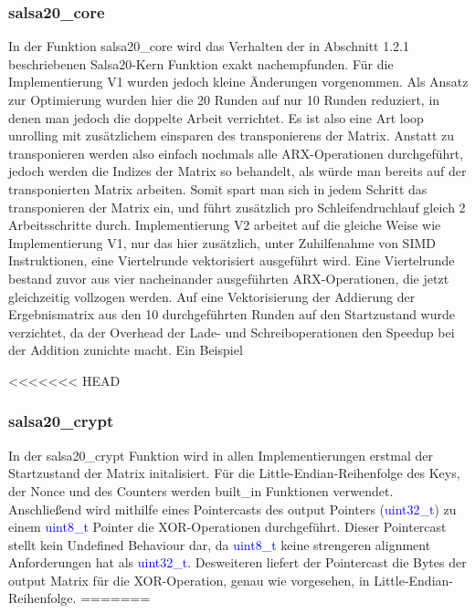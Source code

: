 \documentclass[course=erap]{aspdoc}
\begin{document}
\subsubsection{salsa20\_core}
In der Funktion salsa20\_core wird das Verhalten der in Abschnitt 1.2.1 beschriebenen Salsa20-Kern Funktion exakt nachempfunden. Für die Implementierung V1 wurden jedoch kleine Änderungen vorgenommen.
Als Ansatz zur Optimierung wurden hier die 20 Runden auf nur 10 Runden reduziert, in denen man jedoch die doppelte Arbeit verrichtet. Es ist also eine Art loop unrolling mit zusätzlichem einsparen des 
transponierens der Matrix. Anstatt zu transponieren werden also einfach nochmals alle ARX-Operationen durchgeführt, jedoch werden die Indizes der Matrix so behandelt, als würde man bereits auf
der transponierten Matrix arbeiten. Somit spart man sich in jedem Schritt das transponieren der Matrix ein, und führt zusätzlich pro Schleifendruchlauf gleich 2 Arbeitsschritte durch. Implementierung V2
arbeitet auf die gleiche Weise wie Implementierung V1, nur das hier zusätzlich, unter Zuhilfenahme von SIMD Instruktionen, eine Viertelrunde vektorisiert ausgeführt wird. Eine Viertelrunde bestand zuvor 
aus vier nacheinander ausgeführten ARX-Operationen, die jetzt gleichzeitig vollzogen werden. Auf eine Vektorisierung der Addierung der Ergebnismatrix aus den 10 durchgeführten Runden auf den Startzustand wurde verzichtet,
da der Overhead der Lade- und Schreiboperationen den Speedup bei der Addition zunichte macht.
Ein Beispiel

<<<<<<< HEAD
\subsubsection{salsa20\_crypt}
In der salsa20\_crypt Funktion wird in allen Implementierungen erstmal der Startzustand der Matrix initalisiert. Für die Little-Endian-Reihenfolge des Keys, der Nonce und des Counters werden built\_in Funktionen verwendet.
Anschließend wird mithilfe eines Pointercasts des output Pointers (\textcolor{blue}{uint32\_t}) zu einem \textcolor{blue}{uint8\_t} Pointer die XOR-Operationen durchgeführt. Dieser Pointercast stellt kein Undefined Behaviour dar, 
da \textcolor{blue}{uint8\_t} keine strengeren alignment Anforderungen hat als \textcolor{blue}{uint32\_t}. Desweiteren liefert der Pointercast die Bytes der output Matrix für die XOR-Operation, genau wie vorgesehen, in Little-Endian-Reihenfolge.
=======
\end{document}
